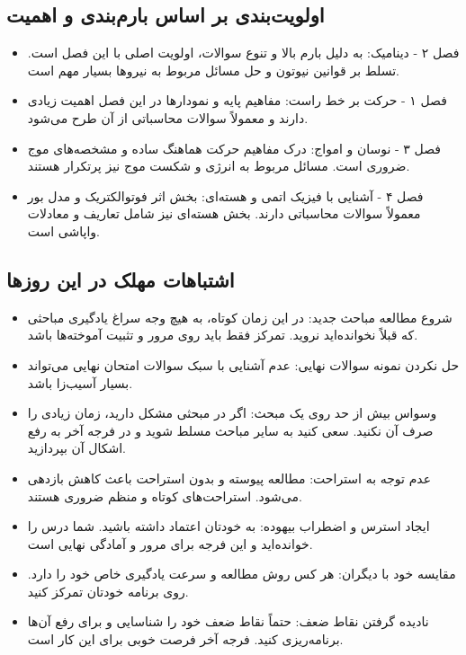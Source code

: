 \documentclass[12pt]{article}
\newcommand{\休息}[1]{\par\centering\textit{#1}\par\vspace{1ex}} %
\begin{document}
\subsection*{اولویت‌بندی بر اساس بارم‌بندی و اهمیت}
\begin{itemize}
    \item فصل ۲ - دینامیک: به دلیل بارم بالا و تنوع سوالات، اولویت اصلی با این فصل است. تسلط بر قوانین نیوتون و حل مسائل مربوط به نیروها بسیار مهم است.
    \item فصل ۱ - حرکت بر خط راست: مفاهیم پایه و نمودارها در این فصل اهمیت زیادی دارند و معمولاً سوالات محاسباتی از آن طرح می‌شود.
    \item فصل ۳ - نوسان و امواج: درک مفاهیم حرکت هماهنگ ساده و مشخصه‌های موج ضروری است. مسائل مربوط به انرژی و شکست موج نیز پرتکرار هستند.
    \item فصل ۴ - آشنایی با فیزیک اتمی و هسته‌ای: بخش اثر فوتوالکتریک و مدل بور معمولاً سوالات محاسباتی دارند. بخش هسته‌ای نیز شامل تعاریف و معادلات واپاشی است.
\end{itemize}

\subsection*{اشتباهات مهلک در این روزها}
\begin{itemize}
    \item شروع مطالعه مباحث جدید: در این زمان کوتاه، به هیچ وجه سراغ یادگیری مباحثی که قبلاً نخوانده‌اید نروید. تمرکز فقط باید روی مرور و تثبیت آموخته‌ها باشد.
    \item حل نکردن نمونه سوالات نهایی: عدم آشنایی با سبک سوالات امتحان نهایی می‌تواند بسیار آسیب‌زا باشد.
    \item وسواس بیش از حد روی یک مبحث: اگر در مبحثی مشکل دارید، زمان زیادی را صرف آن نکنید. سعی کنید به سایر مباحث مسلط شوید و در فرجه آخر به رفع اشکال آن بپردازید.
    \item عدم توجه به استراحت: مطالعه پیوسته و بدون استراحت باعث کاهش بازدهی می‌شود. استراحت‌های کوتاه و منظم ضروری هستند.
    \item ایجاد استرس و اضطراب بیهوده: به خودتان اعتماد داشته باشید. شما درس را خوانده‌اید و این فرجه برای مرور و آمادگی نهایی است.
    \item مقایسه خود با دیگران: هر کس روش مطالعه و سرعت یادگیری خاص خود را دارد. روی برنامه خودتان تمرکز کنید.
    \item نادیده گرفتن نقاط ضعف: حتماً نقاط ضعف خود را شناسایی و برای رفع آن‌ها برنامه‌ریزی کنید. فرجه آخر فرصت خوبی برای این کار است.
\end{itemize}
\end{document}

